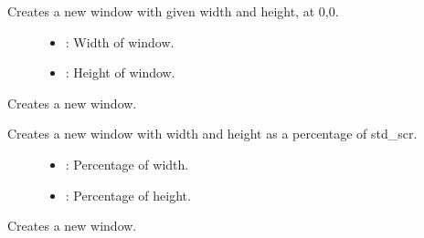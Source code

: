 \documentclass[letterpaper,10pt,english]{sphinxmanual}
\begin{document}
\begin{fulllineitems}
\begin{fulllineitems}
Creates a new window with given width and height, at 0,0. \begin{description}
\item[{}] \leavevmode\begin{itemize}
\item {} 
: Width of window. 

\item {} 
: Height of window. 

\end{itemize}

\end{description}


\end{fulllineitems}


\begin{fulllineitems}
\label{\detokenize{index:_CPPv2N7ostendo6Window6WindowEdd}}%
\pysigstartmultiline
{}\label{\detokenize{index:Pessumclassostendo_1_1Window_1a61857975d28428c0086f13180b582617}}%
\pysigstopmultiline
Creates a new window. 

Creates a new window with width and height as a percentage of std\_scr. \begin{description}
\item[{}] \leavevmode
{\hyperref[\detokenize{index:Pessumnamespaceostendo_1a4c5850c8a109e159e874ecce8a5dc62a}]{}} 

\item[{}] \leavevmode\begin{itemize}
\item {} 
: Percentage of width. 

\item {} 
: Percentage of height. 

\end{itemize}

\end{description}


\end{fulllineitems}


\begin{fulllineitems}
\label{\detokenize{index:_CPPv2N7ostendo6Window6WindowEiiii}}%
\pysigstartmultiline
{}\label{\detokenize{index:Pessumclassostendo_1_1Window_1a08054b16a51c101ea55ec27f628a88c3}}%
\pysigstopmultiline
Creates a new window. 


\end{fulllineitems}
\end{fulllineitems}
\end{document}
